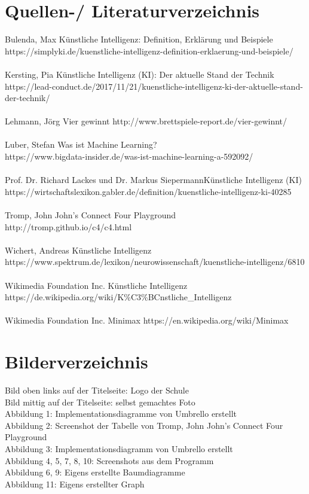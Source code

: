 \documentclass[12pt,a4paper]{article}
\begin{document}
	\section{Quellen-/ Literaturverzeichnis}
	Bulenda, Max \glqq Künstliche Intelligenz: Definition, Erklärung und Beispiele\grqq{}\\ https://simplyki.de/kuenstliche-intelligenz-definition-erklaerung-und-beispiele/\\\\
	Kersting, Pia \glqq Künstliche Intelligenz (KI): Der aktuelle Stand der Technik\grqq{}\\ https://lead-conduct.de/2017/11/21/kuenstliche-intelligenz-ki-der-aktuelle-stand-der-technik/\\\\
	Lehmann, Jörg \glqq Vier gewinnt\grqq{} http://www.brettspiele-report.de/vier-gewinnt/\\\\
	Luber, Stefan \glqq Was ist Machine Learning?\grqq{} \\https://www.bigdata-insider.de/was-ist-machine-learning-a-592092/\\\\
	Prof. Dr. Richard Lackes und Dr. Markus Siepermann\glqq Künstliche Intelligenz (KI)\grqq{}\\ https://wirtschaftslexikon.gabler.de/definition/kuenstliche-intelligenz-ki-40285\\\\
	Tromp, John  \glqq John's Connect Four Playground \grqq{}\\ http://tromp.github.io/c4/c4.html\\\\
	Wichert, Andreas \glqq Künstliche Intelligenz\grqq{}\\ https://www.spektrum.de/lexikon/neurowissenschaft/kuenstliche-intelligenz/6810\\\\
	Wikimedia Foundation Inc. \glqq Künstliche Intelligenz\grqq{}\\ https://de.wikipedia.org/wiki/K\%C3\%BCnstliche\_Intelligenz\\\\
	Wikimedia Foundation Inc. \glqq Minimax\grqq{} https://en.wikipedia.org/wiki/Minimax\\
	\section{Bilderverzeichnis}
	Bild oben links auf der Titelseite: Logo der Schule\\
	Bild mittig auf der Titelseite: selbst gemachtes Foto\\
	Abbildung 1: Implementationsdiagramme von \glqq Umbrello\grqq{} erstellt\\
	Abbildung 2: Screenshot der Tabelle von  Tromp, John  \glqq John's Connect Four Playground \grqq{}\\
	Abbildung 3: Implementationsdiagramm von \glqq Umbrello\grqq{} erstellt\\
	Abbildung 4, 5, 7, 8, 10: Screenshots aus dem Programm\\
	Abbildung 6, 9: Eigens erstellte Baumdiagramme\\
	Abbildung 11: Eigens erstellter Graph\\
\end{document}
